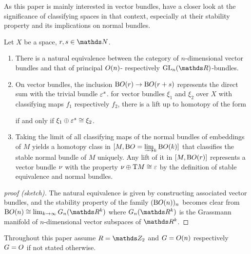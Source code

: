 As this paper is mainly interested in vector bundles, have a closer
look at the significance of classifying spaces in that context,
especially at their stability property and its implications on normal
bundles.
\begin{Lem}\label{lem:classificationvb}
  Let $X$ be a space, $r,s\in\Nat$.
  \begin{enumerate}
  \item\label{item:vbcharacterisation}
    There is a natural equivalence between the category of
    $n$-dimensional vector bundles and that of principal
    $O(n)$- respectively $\GL n$-bundles.
  \item
    On vector bundles, the inclusion $\mathrm{B}O(r)\to\mathrm{B}O(r+s)$
    represents the direct sum with the trivial bundle $\varepsilon^s$.
    \Idest for vector bundles $\xi_1$ and $\xi_2$ over $X$ with
    classifying maps $f_1$ respectively $f_2$, there is a lift up to
    homotopy of the form
    \begin{center}
    \end{center}
    if and only if $\xi_1\oplus\varepsilon^{s}\cong\xi_2$.
  \item\label{item:charclsstablenormalbundle}
    Taking the limit of all classifying maps of the normal bundles of
    embeddings of $M$ yields a homotopy class in
    $[M,\mathrm{B}O=\varinjlim_{k}\mathrm{B}O(k)]$
    that classifies the stable normal bundle of $M$ uniquely.
    Any lift of it in $[M,\mathrm{B}O(r)]$ represents a vector bundle
    $\nu_{}$ with the property $\nu_{}\oplus\mathrm{T}M\cong\varepsilon$ by the
    definition of stable equivalence and normal bundles.
  \end{enumerate}  
  \begin{proof}[proof (sketch)]
    The natural equivalence is given by constructing associated vector
    bundles, and the stability property of the family $(\mathrm{B}O(n))_n$
    becomes clear from $\B\Orth(n)\cong\lim_{k\to\infty}G_n(\R^k)$
    where $G_n(\R^k)$ is the Grassmann manifold of $n$-dimensional
    vector subspaces of $\R^k$.
  \end{proof}
\end{Lem}
\begin{Not}
  Throughout this paper assume $R=\Zmod2$ and $G=O(n)$
  respectively $G=O$ if not stated otherwise.
\end{Not}

